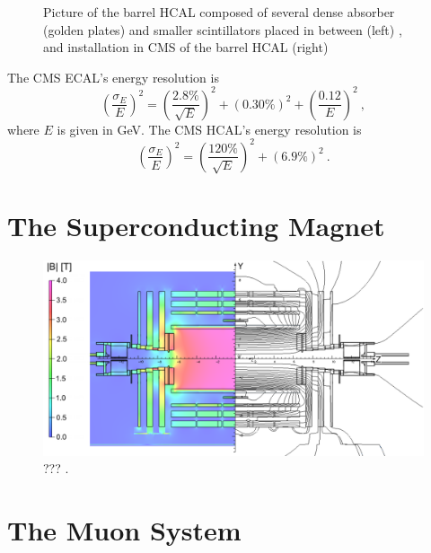   \begin{figure}[h!]
    \centering
    \caption{Picture of the barrel HCAL composed of several dense absorber (golden plates) and smaller scintillators placed in between (left) \Cite{CMS_at_LHC}, and installation in CMS of the barrel HCAL (right) \Cite{CMS_HCAL_Install}}
    \label{fig:lhc_and_cms__cms_hcal_view}
  \end{figure}

  The CMS ECAL's energy resolution is \Cite{CMS_Performances}
  \begin{equation}
    \left( \frac{\sigma_E}{E} \right)^2 = \left( \frac{2.8\%}{\sqrt{E}} \right)^2 + \left( 0.30\% \right)^2 + \left( \frac{0.12}{E} \right)^2 \ ,
  \end{equation}
  where $ E $ is given in GeV. The CMS HCAL's energy resolution is
  \begin{equation}
    \left( \frac{\sigma_E}{E} \right)^2 = \left( \frac{120\%}{\sqrt{E}} \right)^2 + \left( 6.9\% \right)^2 \ .
  \end{equation}


  \section{The Superconducting Magnet}

    \begin{figure}[h!]
      \centering
      \includegraphics[width=\textwidth]{img/I-3-cms/magnet.png}
      \caption{??? \cite{Chatrchyan:2009si}.}
      \label{fig:I-3-cms-magnet}
    \end{figure}

  \section{The Muon System}


